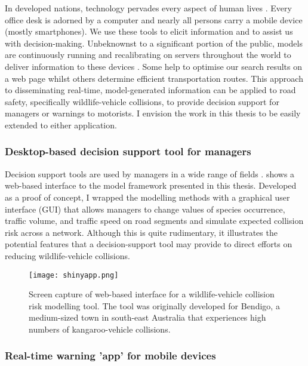 In developed nations, technology pervades every aspect of human lives \citep{}. Every office desk is adorned by a computer and nearly all persons carry a mobile device (mostly smartphones). We use these tools to elicit information and to assist us with decision-making. Unbeknownst to a significant portion of the public, models are continuously running and recalibrating on servers throughout the world to deliver information to these devices \citep{}. Some help to optimise our search results on a web page whilst others determine efficient transportation routes. This approach to disseminating real-time, model-generated information can be applied to road safety, specifically wildlife-vehicle collisions, to provide decision support for managers or warnings to motorists. I envision the work in this thesis to be easily extended to either application.

\subsubsection{Desktop-based decision support tool for managers}

Decision support tools are used by managers in a wide range of fields \citep{}.  shows a web-based interface to the model framework presented in this thesis. Developed as a proof of concept, I wrapped the modelling methods with a graphical user interface (GUI) that allows managers to change values of species occurrence, traffic volume, and traffic speed on road segments and simulate expected collision risk across a network. Although this is quite rudimentary, it illustrates the potential features that a decision-support tool may provide to direct efforts on reducing wildlife-vehicle collisions.

\begin{figure*}[htp]
  \centering
  \texttt{[image: shinyapp.png]}
  \caption[Decision support tool for wildlife-vehicle collisions]{Screen capture of web-based interface for a wildlife-vehicle collision risk modelling tool. The tool was originally developed for Bendigo, a medium-sized town in south-east Australia that experiences high numbers of kangaroo-vehicle collisions.}
  \label{wvc_tool}
\end{figure*}

\subsubsection{Real-time warning 'app' for mobile devices}

